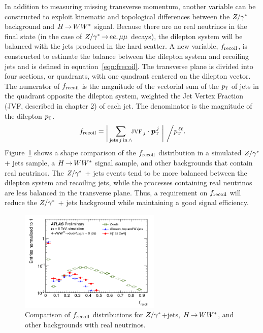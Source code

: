In addition to measuring missing transverse momentum, another variable can be constructed to exploit kinematic and topological differences between the $Z/\gamma^{\ast}$ background and $H{\,{\rightarrow}\,}WW^\ast$ signal. Because there are no real neutrinos in the final state (in the case of $Z/\gamma^{*} \,{\rightarrow}\, ee,\mu\mu$ decays), the dilepton system will be balanced with the jets produced in the hard scatter. A new variable, $f_{\rm recoil}$, is constructed to estimate the balance between the dilepton system and recoiling jets and is defined in equation~\ref{eqn:frecoil}. The transverse plane is divided into four sections, or quadrants, with one quadrant centered on the dilepton vector. The numerator of $f_{\rm recoil}$ is the magnitude of the vectorial sum of the $p_{\textrm{\footnotesize\sc t}}$ of jets in the quadrant opposite the dilepton system, weighted the Jet Vertex Fraction (JVF, described in chapter 2) of each jet. The denominator is the magnitude of the dilepton $p_{\textrm{\footnotesize\sc t}}$. 
%
\begin{equation}
\frecoil = \raisebox{-3pt}{\bigg|} \sum_{{\rm jets\,}j{\rm\,in\,}\wedge}
           \no\jvf_{\,j}\cdot\vpTjet
           ~\raisebox{-3pt}{\bigg|}
           ~\raisebox{-3pt}{\bigg/} \pTll.
\label{eqn:frecoil}
\end{equation}
%
Figure~\ref{fig:frecoil} shows a shape comparison of the $f_{\rm recoil}$ distribution in a simulated $Z/\gamma^{\ast}$ + jets sample, a $H{\,{\rightarrow}\,}WW^\ast$ signal sample, and other backgrounds that contain real neutrinos. The $Z/\gamma^{\ast}$ + jets events tend to be more balanced between the dilepton system and recoiling jets, while the processes containing real neutrinos are less balanced in the transverse plane. Thus, a requirement on $f_{\rm recoil}$ will reduce the $Z/\gamma^{\ast}$ + jets background while maintaining a good signal efficiency. 

\begin{figure}[h!]
  \centering
  \captionsetup{justification=centering}

  \includegraphics[width=0.6\textwidth]{figures/frecoil}
  \caption{Comparison of $f_{\rm recoil}$ distributions for $Z/\gamma^{\ast}$+jets, $H{\,{\rightarrow}\,}WW^\ast$, and other backgrounds with real neutrinos.}
  \label{fig:frecoil}
\end{figure}

